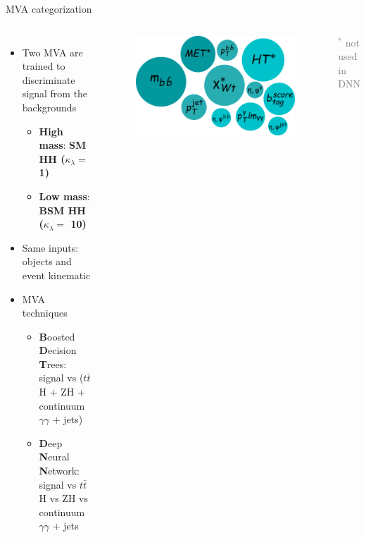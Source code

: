 \begin{frame}{MVA categorization}

\begin{columns}
\begin{itemize}
    \item Two MVA are trained to discriminate signal from the backgrounds
    \begin{itemize}
        \item \textbf{High mass}: \textbf{\textcolor{HHred}{SM HH ($\kappa_{\lambda} = $ 1)}}
        \item \textbf{Low mass}: \textbf{\textcolor{HHturquoise_d}{BSM HH ($\kappa_{\lambda} = $ 10)}}
    \end{itemize}
    \item Same inputs: objects and event kinematic
    \item MVA techniques
    \begin{itemize}
        \item \textcolor{structurColor}{\textbf{B}oosted \textbf{D}ecision \textbf{T}rees}: signal vs ($t\bar{t}$H + ZH + continuum $\gamma\gamma$ + jets)
        \item \textbf{D}eep \textbf{N}eural \textbf{N}etwork: signal vs $t\bar{t}$H vs ZH vs continuum $\gamma\gamma$ + jets
    \end{itemize}
\end{itemize}  


\begin{figure}
    
    \includegraphics[width=1.\textwidth]{Part3/Img/MVA_vars.png}
\end{figure}
\textcolor{gray}{$^{*}$ not used in DNN} \\


\end{columns}   
\end{frame}

